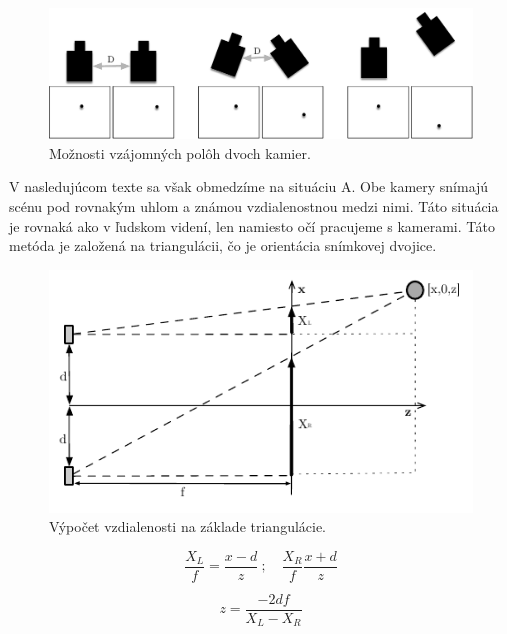 \begin{figure}[H]
\begin{center}
	\includegraphics[scale=0.5]{images/3D_cameraPos}
	\caption{Možnosti vzájomných polôh dvoch kamier.}
	\end{center}
\end{figure}


V nasledujúcom texte sa však obmedzíme na situáciu A. Obe kamery snímajú scénu pod rovnakým uhlom a známou vzdialenostnou medzi nimi. Táto situácia je rovnaká ako v ľudskom videní, len namiesto očí pracujeme s kamerami. Táto metóda je založená na triangulácii, čo je orientácia snímkovej dvojice. \cite{Algorithms_and_Applications} 

\begin{figure}[H]
\begin{center}
	\includegraphics[scale=1.4]{images/stereoscope}
	\caption{Výpočet vzdialenosti na základe triangulácie.}
	\end{center}
\end{figure}


\begin{figure}[H]
    \centering
    \begin{minipage}[b]{0.49\textwidth}
        \begin{equation}
            \frac{X_L}{f}=\frac{x-d}{z}\ {;}\quad \frac{X_R}{f}\frac{x+d}{z}
        \end{equation}
    \end{minipage}
    \hfill
    \begin{minipage}[b]{0.49\textwidth}
        \begin{equation}
            z=\frac{-2df}{X_L-X_R}
       \end{equation}
    \end{minipage}
\end{figure}



